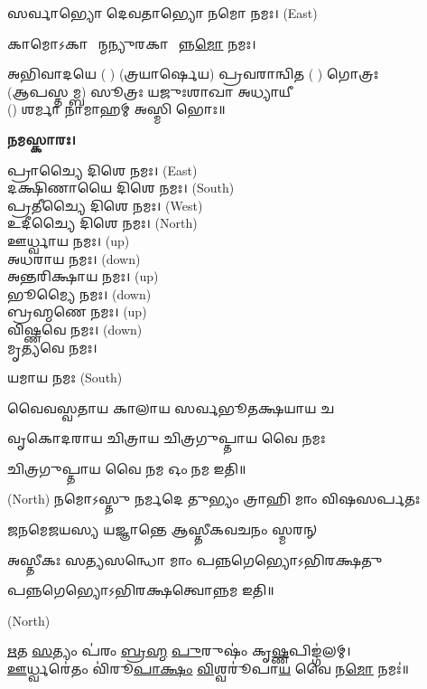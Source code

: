𑌸𑌰𑍍𑌵𑌾𑌭𑍍𑌯𑍋 𑌦𑍇𑌵𑌤𑌾𑌭𑍍𑌯𑍋 𑌨𑌮𑍋 𑌨𑌮𑌃। {\scriptsize (East)}

𑌕𑌾𑌮𑍋𑌽𑌕𑌾𑌰𑍍\mbox{}𑌷𑍀᳚𑌨𑍍𑌮𑌨𑍍𑌯𑍁𑌰𑌕𑌾𑌰𑍍\mbox{}𑌷𑍀᳚𑌨𑍍𑌨\ul{𑌮𑍋} 𑌨𑌮𑌃।

𑌅𑌭𑌿𑌵𑌾𑌦𑌯𑍇 ( ) (𑌤𑍍𑌰𑌯𑌾𑌰𑍍𑌷𑍇𑌯) 𑌪𑍍𑌰𑌵𑌰𑌾𑌨𑍍𑌵𑌿𑌤 ( ) 𑌗𑍋𑌤𑍍𑌰𑌃\\
(𑌆𑌪𑌸𑍍𑌤𑌮𑍍𑌬) 𑌸𑍂𑌤𑍍𑌰𑌃 𑌯𑌜𑍁𑌃𑌶𑌾𑌖𑌾 𑌅𑌧𑍍𑌯𑌾𑌯𑍀\\
() 𑌶𑌰𑍍𑌮𑌾 𑌨𑌾𑌮𑌾𑌹𑌮𑍍 𑌅𑌸𑍍𑌮𑌿 𑌭𑍋𑌃॥

\textbf{𑌨𑌮𑌸𑍍𑌕𑌾𑌰𑌃।}


𑌪𑍍𑌰𑌾𑌚𑍍𑌯𑍈 𑌦𑌿𑌶𑍇 𑌨𑌮𑌃।   {\scriptsize (East)}\\
𑌦𑌕𑍍𑌷𑌿𑌣𑌾𑌯𑍈 𑌦𑌿𑌶𑍇 𑌨𑌮𑌃।  {\scriptsize (South)}\\
𑌪𑍍𑌰𑌤𑍀𑌚𑍍𑌯𑍈 𑌦𑌿𑌶𑍇 𑌨𑌮𑌃।   {\scriptsize (West)}\\
𑌉𑌦𑍀𑌚𑍍𑌯𑍈 𑌦𑌿𑌶𑍇 𑌨𑌮𑌃।   {\scriptsize (North)}\\
𑌊𑌰𑍍𑌧𑍍𑌵𑌾𑌯 𑌨𑌮𑌃।   {\scriptsize (up)}\\
𑌅𑌧𑌰𑌾𑌯 𑌨𑌮𑌃।   {\scriptsize (down)}\\
𑌅𑌨𑍍𑌤𑌰𑌿𑌕𑍍𑌷𑌾𑌯 𑌨𑌮𑌃। {\scriptsize (up)}\\
𑌭𑍂𑌮𑍍𑌯𑍈 𑌨𑌮𑌃। {\scriptsize (down)}\\
𑌬𑍍𑌰𑌹𑍍𑌮𑌣𑍇 𑌨𑌮𑌃। {\scriptsize (up)}\\
𑌵𑌿𑌷𑍍𑌣𑌵𑍇 𑌨𑌮𑌃।  {\scriptsize (down)}\\
𑌮𑍃𑌤𑍍𑌯𑌵𑍇 𑌨𑌮𑌃।

𑌯𑌮𑌾𑌯 𑌨𑌮𑌃   {\scriptsize (South)}

{𑌵𑍈𑌵𑌸𑍍𑌵𑌤𑌾𑌯   𑌕𑌾𑌲𑌾𑌯   𑌸𑌰𑍍𑌵𑌭𑍂𑌤𑌕𑍍𑌷𑌯𑌾𑌯   𑌚}

{𑌵𑍃𑌕𑍋𑌦𑌰𑌾𑌯   𑌚𑌿𑌤𑍍𑌰𑌾𑌯   𑌚𑌿𑌤𑍍𑌰𑌗𑍁𑌪𑍍𑌤𑌾𑌯   𑌵𑍈  𑌨𑌮𑌃}

𑌚𑌿𑌤𑍍𑌰𑌗𑍁𑌪𑍍𑌤𑌾𑌯   𑌵𑍈  𑌨𑌮 𑌓𑌂 𑌨𑌮 𑌇𑌤𑌿॥

 {\scriptsize (North)}
{𑌨𑌮𑍋𑌽𑌸𑍍𑌤𑍁 𑌨𑌰𑍍𑌮𑌦𑍇 𑌤𑍁𑌭𑍍𑌯𑌂 𑌤𑍍𑌰𑌾𑌹𑌿 𑌮𑌾𑌂 𑌵𑌿𑌷𑌸𑌰𑍍𑌪𑌤𑌃}

{𑌜𑌨𑌮𑍇𑌜𑌯𑌸𑍍𑌯 𑌯𑌜𑍍𑌞𑌾𑌨𑍍𑌤𑍇 𑌆𑌸𑍍𑌤𑍀𑌕𑌵𑌚𑌨𑌂 𑌸𑍍𑌮𑌰𑌨𑍍}


{𑌅𑌸𑍍𑌤𑍀𑌕𑌃 𑌸𑌤𑍍𑌯𑌸𑌨𑍍𑌧𑍋 𑌮𑌾𑌂 𑌪𑌨𑍍𑌨𑌗𑍇𑌭𑍍𑌯𑍋𑌽𑌭𑌿𑌰𑌕𑍍𑌷𑌤𑍁}

𑌪𑌨𑍍𑌨𑌗𑍇𑌭𑍍𑌯𑍋𑌽𑌭𑌿𑌰𑌕𑍍𑌷𑌤𑍍𑌵𑍋𑌨𑍍𑌨𑌮 𑌇𑌤𑌿॥

 {\scriptsize (North)}

\ul{𑌋}𑌤 \ul{𑌸}𑌤𑍍𑌯𑌂 𑌪॑𑌰𑌂 \ul{𑌬𑍍𑌰}\ul{𑌹𑍍𑌮} \ul{𑌪𑍁}𑌰𑍁𑌷𑌂॑ 𑌕𑍃\ul{𑌷𑍍𑌣}𑌪𑌿𑌙𑍍𑌗॑𑌲𑌮𑍍।\\
\ul{𑌊}𑌰𑍍𑌧𑍍𑌵𑌰𑍇॑𑌤𑌂 𑌵𑌿॑𑌰𑍂\ul{𑌪𑌾}\ul{𑌕𑍍𑌷𑌂} \ul{𑌵𑌿}𑌶𑍍𑌵𑌰𑍂॑𑌪𑌾\ul{𑌯} 𑌵𑍈 𑌨\ul{𑌮𑍋} 𑌨𑌮𑌃॑॥


